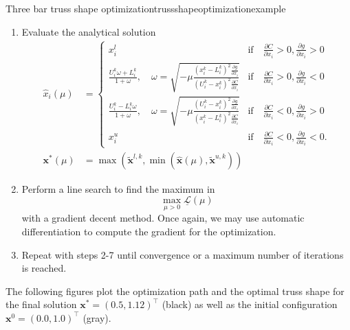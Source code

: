\begin{example}{Three bar truss shape optimization}{trussshapeoptimizationexample}
\begin{enumerate}
        \item Evaluate the analytical solution
            \begin{align}
                \hat{x}_i(\mu) &= 
                \begin{cases}
                    x^l_i 
                        &\textrm{if} \quad \frac{\partial C}{\partial x_i} > 0, \frac{\partial g}{\partial x_i} > 0 \\
                    \frac{U_i^k\omega + L_i^k}{1+\omega}, \quad \omega = \sqrt{-\mu\frac{(x_i^k-L_i^k)^2\frac{\partial g}{\partial x_i}}{(U_i^k-x_i^k)^2\frac{\partial C}{\partial x_i}}}
                        &\textrm{if} \quad \frac{\partial C}{\partial x_i}  > 0, \frac{\partial g}{\partial x_i} <0\\
                    \frac{U_i^k-L_i^k\omega}{1+\omega}, \quad \omega = \sqrt{-\mu\frac{(U_i^k-x_i^k)^2\frac{\partial g}{\partial x_i}}{(x_i^k-L_i^k)^2\frac{\partial C}{\partial x_i}}} 
                        &\textrm{if} \quad \frac{\partial C}{\partial x_i} < 0, \frac{\partial g}{\partial x_i}  > 0\\
                    x^u_i 
                        &\textrm{if} \quad \frac{\partial C}{\partial x_i}< 0, \frac{\partial g}{\partial x_i} < 0.
                \end{cases} \\
                \mathbf{x}^* (\mu) &= \max\left(\tilde{\mathbf{x}}^{l,k}, \min \left(\hat{\mathbf{x}}(\mu), \tilde{\mathbf{x}}^{u,k} \right)\right)
            \end{align}
        \item Perform a line search to find the maximum in 
            \begin{equation}
                \max_{\mu>0} \underline{\mathcal{L}}(\mu)
            \end{equation}
            with a gradient decent method. Once again, we may use automatic differentiation to compute the gradient for the optimization.
        \item Repeat with steps 2-7 until convergence or a maximum number of iterations is reached.
    \end{enumerate}
    
    The following figures plot the optimization path and the optimal truss shape for the final solution $\mathbf{x}^* = (0.5, 1.12)^\top$ (black) as well as the initial configuration $\mathbf{x}^0 = (0.0, 1.0)^\top$ (gray).

    \begin{minipage}{.5\textwidth}
        \centering
        
    \end{minipage}%
    \begin{minipage}{.5\textwidth}
        \centering
        
    \end{minipage}
       
\end{example}


 





